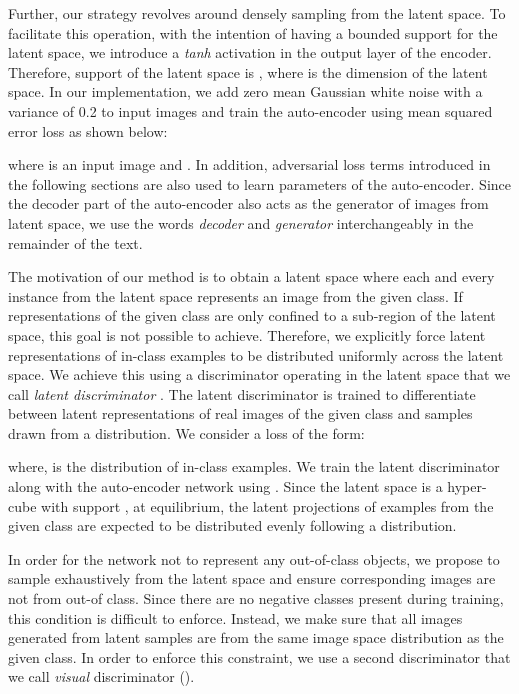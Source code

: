 \documentclass[10pt,twocolumn,letterpaper]{article}
\begin{document}
Further, our strategy revolves around densely sampling from the latent space. To facilitate this operation, with the intention of having a bounded support for the latent space, we introduce a {\it tanh} activation in the output layer of the encoder. Therefore, support of the latent space is , where  is the dimension of the latent space. In our implementation, we add zero mean Gaussian white noise with a variance of 0.2 to input images and train the auto-encoder using mean squared error loss as shown below:



\noindent where  is an input image and . In addition, adversarial loss terms introduced in the following sections are also used to learn parameters of the auto-encoder. Since the decoder part of the auto-encoder also acts as the generator of images from latent space, we use the words {\it decoder} and {\it generator} interchangeably in the remainder of the text. 

 The motivation of our method is to obtain a latent space where each and every instance from the latent space represents an image from the given class. If representations of the given class are only confined to a sub-region of the latent space, this goal is not possible to achieve. Therefore, we explicitly force latent representations of in-class examples to be distributed uniformly across the latent space. We achieve this using a discriminator operating in the latent space that we call \textit{latent discriminator  }. The latent discriminator is trained to differentiate between latent representations of real images of the given class and samples drawn from a  distribution. We consider a loss of the form:

\noindent where,  is the distribution of in-class examples. We train the latent discriminator along with the auto-encoder network using . Since the latent space is a hyper-cube with support , at equilibrium, the latent projections of examples from the given class are expected to be distributed evenly following a  distribution.

 In order for the network not to represent any out-of-class objects, we propose to sample exhaustively from the latent space and ensure corresponding images are not from out-of class. Since there are no negative classes present during training, this condition is difficult to enforce. Instead, we make sure that all images generated from latent samples are from the same image space distribution as the given class. In order to enforce this constraint, we use a second discriminator that we call {\it visual} discriminator (). 
\end{document}
